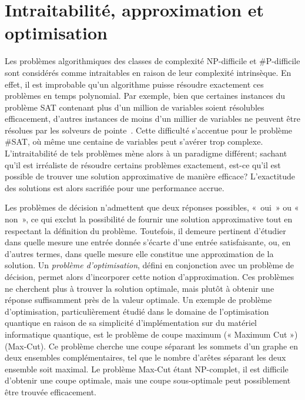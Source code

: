 
\section{Intraitabilité, approximation et optimisation}
\label{sec:intractabilite-approximation-et-optimisation}

Les problèmes algorithmiques des classes de complexité \textsf{NP}-difficile et \textsf{\#P}-difficile sont considérés comme intraitables en raison de leur complexité intrinsèque. En effet, il est improbable qu'un algorithme puisse résoudre exactement ces problèmes en temps polynomial. Par exemple, bien que certaines instances du problème SAT contenant plus d'un million de variables soient résolubles efficacement, d'autres instances de moins d'un millier de variables ne peuvent être résolues par les solveurs de pointe~\cite{froleyksSATCompetition20202021}. Cette difficulté s'accentue pour le problème \#SAT, où même une centaine de variables peut s'avérer trop complexe. L'intraitabilité de tels problèmes mène alors à un paradigme différent; sachant qu'il est irréaliste de résoudre certains problèmes exactement, est-ce qu'il est possible de trouver une solution approximative de manière efficace? L'exactitude des solutions est alors sacrifiée pour une performance accrue.

Les problèmes de décision n'admettent que deux réponses possibles, « oui » ou « non », ce qui exclut la possibilité de fournir une solution approximative tout en respectant la définition du problème. Toutefois, il demeure pertinent d'étudier dans quelle mesure une entrée donnée s'écarte d'une entrée satisfaisante, ou, en d'autres termes, dans quelle mesure elle constitue une approximation de la solution. Un \textit{problème d'optimisation}, défini en conjonction avec un problème de décision, permet alors d'incorporer cette notion d'approximation. Ces problèmes ne cherchent plus à trouver la solution optimale, mais plutôt à obtenir une réponse suffisamment près de la valeur optimale. Un exemple de problème d'optimisation, particulièrement étudié dans le domaine de l'optimisation quantique en raison de sa simplicité d'implémentation sur du matériel informatique quantique, est le problème de coupe maximum (­« Maximum Cut ») (Max-Cut). Ce problème cherche une coupe séparant les sommets d'un graphe en deux ensembles complémentaires, tel que le nombre d'arêtes séparant les deux ensemble soit maximal. Le problème Max-Cut étant \textsf{NP}-complet, il est difficile d'obtenir une coupe optimale, mais une coupe sous-optimale peut possiblement être trouvée efficacement.

